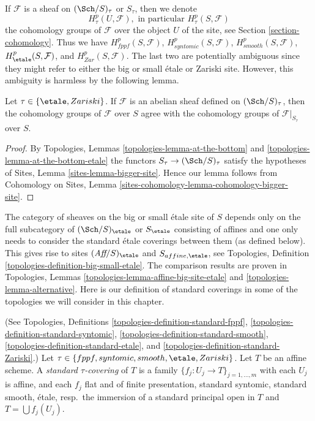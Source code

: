 \medskip\noindent
If $\mathcal{F}$ is a sheaf on $(\Sch/S)_\tau$ or $S_\tau$, then
we denote
$$
H^p_\tau(U, \mathcal{F}), \text{ in particular }
H^p_\tau(S, \mathcal{F})
$$
the cohomology groups of $\mathcal{F}$ over the object $U$ of the site, see
Section \ref{section-cohomology}. Thus we have
$H^p_{fppf}(S, \mathcal{F})$,
$H^p_{syntomic}(S, \mathcal{F})$,
$H^p_{smooth}(S, \mathcal{F})$,
$H^p_\etale(S, \mathcal{F})$, and
$H^p_{Zar}(S, \mathcal{F})$. The last two are potentially ambiguous since
they might refer to either the big or small \'etale or Zariski site. However,
this ambiguity is harmless by the following lemma.

\begin{lemma}
\label{lemma-compare-cohomology-big-small}
Let $\tau \in \{\etale, Zariski\}$.
If $\mathcal{F}$ is an abelian sheaf defined on
$(\Sch/S)_\tau$, then
the cohomology groups of $\mathcal{F}$ over $S$ agree with the cohomology
groups of $\mathcal{F}|_{S_\tau}$ over $S$.
\end{lemma}

\begin{proof}
By
Topologies, Lemmas \ref{topologies-lemma-at-the-bottom} and
\ref{topologies-lemma-at-the-bottom-etale}
the functors $S_\tau \to (\Sch/S)_\tau$
satisfy the hypotheses of
Sites, Lemma \ref{sites-lemma-bigger-site}.
Hence our lemma follows from
Cohomology on Sites, Lemma \ref{sites-cohomology-lemma-cohomology-bigger-site}.
\end{proof}

\noindent
The category of sheaves on the big or small \'etale site of $S$ depends only
on the full subcategory of $(\Sch/S)_\etale$ or $S_\etale$ consisting of
affines and one only needs to consider the standard \'etale coverings between
them (as defined below). This gives rise to sites
$(\textit{Aff}/S)_\etale$ and $S_{affine, \etale}$, see
Topologies, Definition \ref{topologies-definition-big-small-etale}.
The comparison results are proven in Topologies,
Lemmas \ref{topologies-lemma-affine-big-site-etale} and
\ref{topologies-lemma-alternative}. Here is our definition of
standard coverings in some of the topologies we will consider in this chapter.

\begin{definition}
\label{definition-standard-tau}
(See
Topologies, Definitions
\ref{topologies-definition-standard-fppf},
\ref{topologies-definition-standard-syntomic},
\ref{topologies-definition-standard-smooth},
\ref{topologies-definition-standard-etale}, and
\ref{topologies-definition-standard-Zariski}.)
Let $\tau \in \{fppf, syntomic, smooth, \etale, Zariski\}$.
Let $T$ be an affine scheme.
A {\it standard $\tau$-covering} of $T$ is a family
$\{f_j : U_j \to T\}_{j = 1, \ldots, m}$ with each $U_j$ is affine,
and each $f_j$ flat and of finite presentation,
standard syntomic, standard smooth, \'etale, resp.\ the immersion of a
standard principal open in $T$ and $T = \bigcup f_j(U_j)$.
\end{definition}

